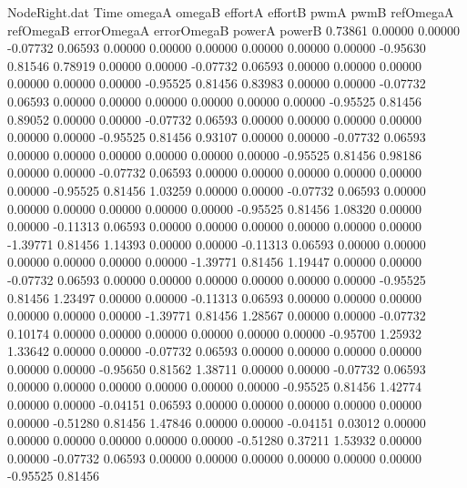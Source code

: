 \begin{filecontents}{NodeRight.dat}
Time omegaA omegaB effortA effortB pwmA pwmB refOmegaA refOmegaB errorOmegaA errorOmegaB powerA powerB
   0.73861    0.00000    0.00000    -0.07732    0.06593    0.00000    0.00000    0.00000    0.00000    0.00000    0.00000   -0.95630    0.81546
   0.78919    0.00000    0.00000    -0.07732    0.06593    0.00000    0.00000    0.00000    0.00000    0.00000    0.00000   -0.95525    0.81456
   0.83983    0.00000    0.00000    -0.07732    0.06593    0.00000    0.00000    0.00000    0.00000    0.00000    0.00000   -0.95525    0.81456
   0.89052    0.00000    0.00000    -0.07732    0.06593    0.00000    0.00000    0.00000    0.00000    0.00000    0.00000   -0.95525    0.81456
   0.93107    0.00000    0.00000    -0.07732    0.06593    0.00000    0.00000    0.00000    0.00000    0.00000    0.00000   -0.95525    0.81456
   0.98186    0.00000    0.00000    -0.07732    0.06593    0.00000    0.00000    0.00000    0.00000    0.00000    0.00000   -0.95525    0.81456
   1.03259    0.00000    0.00000    -0.07732    0.06593    0.00000    0.00000    0.00000    0.00000    0.00000    0.00000   -0.95525    0.81456
   1.08320    0.00000    0.00000    -0.11313    0.06593    0.00000    0.00000    0.00000    0.00000    0.00000    0.00000   -1.39771    0.81456
   1.14393    0.00000    0.00000    -0.11313    0.06593    0.00000    0.00000    0.00000    0.00000    0.00000    0.00000   -1.39771    0.81456
   1.19447    0.00000    0.00000    -0.07732    0.06593    0.00000    0.00000    0.00000    0.00000    0.00000    0.00000   -0.95525    0.81456
   1.23497    0.00000    0.00000    -0.11313    0.06593    0.00000    0.00000    0.00000    0.00000    0.00000    0.00000   -1.39771    0.81456
   1.28567    0.00000    0.00000    -0.07732    0.10174    0.00000    0.00000    0.00000    0.00000    0.00000    0.00000   -0.95700    1.25932
   1.33642    0.00000    0.00000    -0.07732    0.06593    0.00000    0.00000    0.00000    0.00000    0.00000    0.00000   -0.95650    0.81562
   1.38711    0.00000    0.00000    -0.07732    0.06593    0.00000    0.00000    0.00000    0.00000    0.00000    0.00000   -0.95525    0.81456
   1.42774    0.00000    0.00000    -0.04151    0.06593    0.00000    0.00000    0.00000    0.00000    0.00000    0.00000   -0.51280    0.81456
   1.47846    0.00000    0.00000    -0.04151    0.03012    0.00000    0.00000    0.00000    0.00000    0.00000    0.00000   -0.51280    0.37211
   1.53932    0.00000    0.00000    -0.07732    0.06593    0.00000    0.00000    0.00000    0.00000    0.00000    0.00000   -0.95525    0.81456

\end{filecontents}
